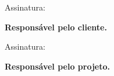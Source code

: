 \noindent Assinatura: \hrulefill

\begin{center}
    \textbf{Responsável pelo cliente.}
\end{center}

\vspace{1cm}

\noindent Assinatura: \hrulefill

\begin{center}
    \textbf{Responsável pelo projeto.}
\end{center}